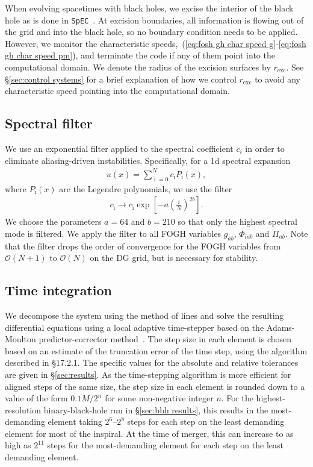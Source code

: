 \documentclass[12pt]{caltech_thesis}
\begin{document}
\begin{bibunit}[unsrtnat]
When evolving spacetimes with black holes, we excise the interior of the black
hole as is done in \texttt{SpEC}~\cite{Lindblom:2005qh}. At excision boundaries,
all information is flowing out of the grid and into the black hole, so no
boundary condition needs to be applied. However, we monitor the characteristic
speeds,~(\ref{eq:fosh gh char speed g}-\ref{eq:fosh gh char speed pm}),
and terminate the code if any of them point into the computational domain. We
denote the radius of the excision surfaces by $r_{\mathrm{exc}}$. See 
\S\ref{sec:control systems} for a brief explanation of how we control
$r_{\mathrm{exc}}$ to avoid any characteristic speed pointing into the
computational domain.

\subsection{Spectral filter\label{sec:gh spectral filter}}
We use an exponential filter applied to the spectral coefficient $c_i$ in order
to eliminate aliasing-driven instabilities. Specifically, for a 1d spectral
expansion
\begin{eqnarray}
  \label{eq:u spectral expansion}
  u(x)=\sum_{\breve{\imath}=0}^{N}c_{\breve{\imath}} P_{\breve{\imath}}(x),
\end{eqnarray}
where $P_{\breve{\imath}}(x)$ are the Legendre polynomials, we use the filter
\begin{eqnarray}
  \label{eq:exponential filter}
  c_{\breve{\imath}} \to c_{\breve{\imath}}
  \exp\left[-a\left(\frac{i}{N}\right)^{2b}\right].
\end{eqnarray}
We choose the parameters $a=64$ and $b=210$ so that only the highest
spectral mode is filtered. We apply the filter to all FOGH variables $g_{ab}$,
$\Phi_{iab}$ and $\Pi_{ab}$. Note that the filter drops the order of convergence
for the FOGH variables from $\mathcal{O}(N+1)$ to $\mathcal{O}(N)$ on the DG
grid, but is necessary for stability.

\subsection{Time integration\label{sec:time integration}}
We decompose the system using the method of lines and solve the resulting
differential equations using a local adaptive time-stepper based on the
Adams-Moulton predictor-corrector method~\cite{ThroweLTSAM}.  The
step size in each element is chosen based on an estimate of the truncation error
of the time step, using the algorithm described in \cite{NumericalRecipes}
\S17.2.1. The specific values for the absolute and relative tolerances are
given in \S\ref{sec:results}. As the time-stepping algorithm
is more efficient for aligned steps of the same size, the step size in each
element is rounded down to a value of the form $0.1 M / 2^n$ for some
non-negative integer $n$.  For the highest-resolution binary-black-hole run in
\S\ref{sec:bbh results}, 
this results in the most-demanding element taking $2^6$--$2^8$ steps for each
step on the least demanding element for most of the inspiral. At the time of
merger, this can increase to as high as $2^{11}$ steps for the most-demanding
element for each step on the least demanding element.


\end{bibunit}
\end{document}

